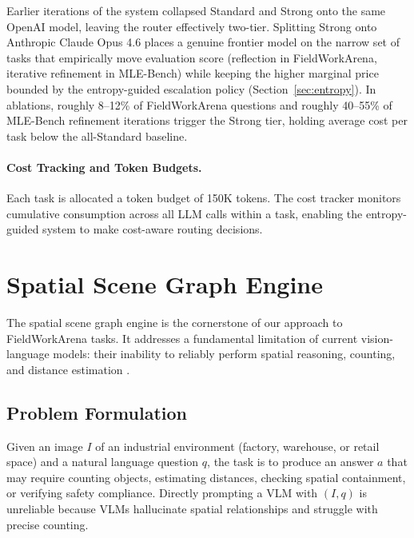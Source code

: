 \documentclass[11pt]{article}
\begin{document}
Earlier iterations of the system collapsed Standard and Strong onto the same OpenAI model, leaving the router effectively two-tier. Splitting Strong onto Anthropic Claude Opus 4.6 places a genuine frontier model on the narrow set of tasks that empirically move evaluation score (reflection in FieldWorkArena, iterative refinement in MLE-Bench) while keeping the higher marginal price bounded by the entropy-guided escalation policy (Section~\ref{sec:entropy}). In ablations, roughly 8--12\% of FieldWorkArena questions and roughly 40--55\% of MLE-Bench refinement iterations trigger the Strong tier, holding average cost per task below the all-Standard baseline.

\paragraph{Cost Tracking and Token Budgets.} Each task is allocated a token budget of 150K tokens. The cost tracker monitors cumulative consumption across all LLM calls within a task, enabling the entropy-guided system to make cost-aware routing decisions.

\section{Spatial Scene Graph Engine}
\label{sec:spatial}

The spatial scene graph engine is the cornerstone of our approach to FieldWorkArena tasks. It addresses a fundamental limitation of current vision-language models: their inability to reliably perform spatial reasoning, counting, and distance estimation \citep{chen2024spatialvlm, li2023evaluating}.

\subsection{Problem Formulation}

Given an image $I$ of an industrial environment (factory, warehouse, or retail space) and a natural language question $q$, the task is to produce an answer $a$ that may require counting objects, estimating distances, checking spatial containment, or verifying safety compliance. Directly prompting a VLM with $(I, q)$ is unreliable because VLMs hallucinate spatial relationships and struggle with precise counting.
\end{document}
